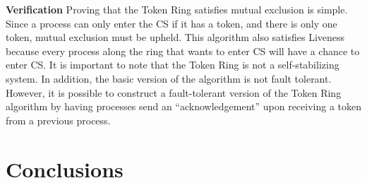 \documentclass[12pt]{article}
\begin{document}
\begin{flushleft}
\textbf{Verification}
\newline
Proving that the Token Ring satisfies mutual exclusion is simple. Since a process can only enter the CS if it has a token, and there is only one token, mutual exclusion must be upheld. This algorithm also satisfies Liveness because every process along the ring that wants to enter CS will have a chance to enter CS. 
It is important to note that the Token Ring is not a self-stabilizing system. In addition, the basic version of the algorithm is not fault tolerant. However, it is possible to construct a fault-tolerant version of the Token Ring algorithm by having processes send an “acknowledgement” upon receiving a token from a previous process. 

\section{Conclusions}

\end{flushleft}
\end{document}
